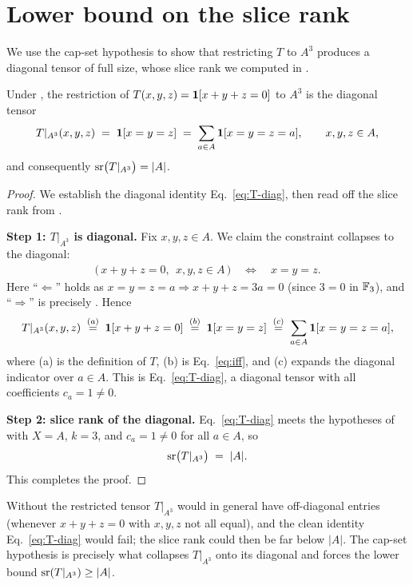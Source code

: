 \section{Lower bound on the slice rank}\label{sec:lower}

We use the cap-set hypothesis to show that restricting $T$ to $A^3$ produces a
diagonal tensor of full size, whose slice rank we computed in
.

\begin{lemma}\label{lem:lower}
Under , the restriction of $T(x,y,z)=\mathbf{1}[x+y+z=0]$ to $A^3$ is the
diagonal tensor
\begin{align}\label{eq:T-diag}
T|_{A^3}(x,y,z)\;=\;\mathbf{1}[x=y=z]\;=\;\sum_{a\in A}\mathbf{1}[x=y=z=a],
\qquad x,y,z\in A,
\end{align}
and consequently $\operatorname{sr}\!\big(T|_{A^3}\big)=|A|$.
\end{lemma}

\begin{proof}
We establish the diagonal identity Eq.~\eqref{eq:T-diag}, then read off the slice
rank from .

\smallskip\noindent
\textbf{Step 1: $T|_{A^3}$ is diagonal.}
Fix $x,y,z\in A$. We claim the constraint collapses to the diagonal:
\begin{align}\label{eq:iff}
\bigl(\,x+y+z=0,\ \ x,y,z\in A\,\bigr)\quad\Longleftrightarrow\quad x=y=z.
\end{align}
Here ``$\Leftarrow$'' holds as $x=y=z=a\Rightarrow x+y+z=3a=0$ (since $3=0$ in
$\mathbb{F}_3$), and ``$\Rightarrow$'' is precisely . Hence
\begin{align*}
T|_{A^3}(x,y,z)
\;\overset{(a)}{=}\;\mathbf{1}[x+y+z=0]
\;\overset{(b)}{=}\;\mathbf{1}[x=y=z]
\;\overset{(c)}{=}\;\sum_{a\in A}\mathbf{1}[x=y=z=a],
\end{align*}
where (a) is the definition of $T$, (b) is Eq.~\eqref{eq:iff}, and (c) expands the
diagonal indicator over $a\in A$. This is Eq.~\eqref{eq:T-diag}, a diagonal tensor
with all coefficients $c_a=1\ne 0$.

\smallskip\noindent
\textbf{Step 2: slice rank of the diagonal.}
Eq.~\eqref{eq:T-diag} meets the hypotheses of  with
$X=A$, $k=3$, and $c_a=1\ne 0$ for all $a\in A$, so
\begin{align*}
\operatorname{sr}\!\big(T|_{A^3}\big)\;=\;|A|.
\end{align*}
This completes the proof.
\end{proof}

\begin{remark}\label{rem:no-3ap-load}
Without  the restricted tensor $T|_{A^3}$ would in general have
off-diagonal entries (whenever $x+y+z=0$ with $x,y,z$ not all equal), and the clean
identity Eq.~\eqref{eq:T-diag} would fail; the slice rank could then be far below $|A|$.
The cap-set hypothesis is precisely what collapses $T|_{A^3}$ onto its diagonal and
forces the lower bound $\operatorname{sr}(T|_{A^3})\ge|A|$.
\end{remark}
